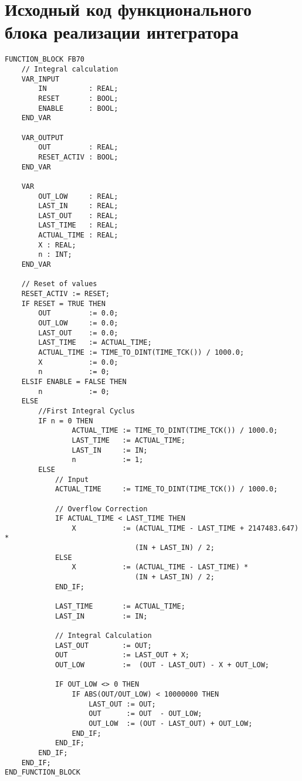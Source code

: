 \section{Исходный код функционального блока реализации интегратора} \label{AppendixB5}
\begin{verbatim}
FUNCTION_BLOCK FB70
    // Integral calculation 
    VAR_INPUT
        IN          : REAL;
        RESET       : BOOL;
        ENABLE      : BOOL;
    END_VAR
    
    VAR_OUTPUT
        OUT         : REAL;
        RESET_ACTIV : BOOL;
    END_VAR    
    
    VAR
        OUT_LOW     : REAL;
        LAST_IN     : REAL;
        LAST_OUT    : REAL;
        LAST_TIME   : REAL;
        ACTUAL_TIME : REAL;
        X : REAL;
        n : INT;
    END_VAR
    
    // Reset of values
    RESET_ACTIV := RESET;
    IF RESET = TRUE THEN
        OUT         := 0.0;
        OUT_LOW     := 0.0;
        LAST_OUT    := 0.0;
        LAST_TIME   := ACTUAL_TIME;
        ACTUAL_TIME := TIME_TO_DINT(TIME_TCK()) / 1000.0;
        X           := 0.0;
        n           := 0;
    ELSIF ENABLE = FALSE THEN
        n           := 0;   
    ELSE
        //First Integral Cyclus
        IF n = 0 THEN
                ACTUAL_TIME := TIME_TO_DINT(TIME_TCK()) / 1000.0;
                LAST_TIME   := ACTUAL_TIME;
                LAST_IN     := IN;
                n           := 1;
        ELSE  
            // Input 
            ACTUAL_TIME     := TIME_TO_DINT(TIME_TCK()) / 1000.0;
            
            // Overflow Correction
            IF ACTUAL_TIME < LAST_TIME THEN
                X           := (ACTUAL_TIME - LAST_TIME + 2147483.647) *
                               (IN + LAST_IN) / 2; 
            ELSE
                X           := (ACTUAL_TIME - LAST_TIME) * 
                               (IN + LAST_IN) / 2;
            END_IF;
        
            LAST_TIME       := ACTUAL_TIME;
            LAST_IN         := IN;
    
            // Integral Calculation
            LAST_OUT        := OUT;
            OUT             := LAST_OUT + X; 
            OUT_LOW         :=  (OUT - LAST_OUT) - X + OUT_LOW;
    
            IF OUT_LOW <> 0 THEN
                IF ABS(OUT/OUT_LOW) < 10000000 THEN
                    LAST_OUT := OUT;
                    OUT      := OUT  - OUT_LOW;
                    OUT_LOW  := (OUT - LAST_OUT) + OUT_LOW;
                END_IF;
            END_IF;
        END_IF;
    END_IF;
END_FUNCTION_BLOCK
\end{verbatim}

